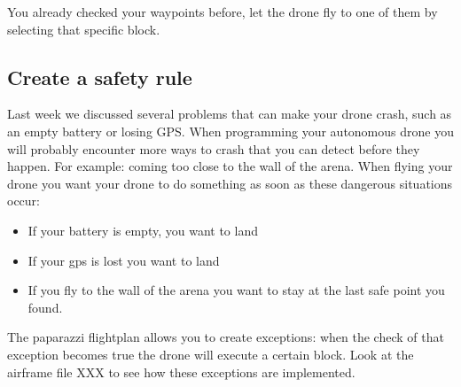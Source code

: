 \documentclass{article}
\begin{document}
You already checked your waypoints before, let the drone fly to one of them by selecting that specific block. 


\subsection*{Create a safety rule}
Last week we discussed several problems that can make your drone crash, such as an empty battery or losing GPS. When programming your autonomous drone you will probably encounter more ways to crash that you can detect before they happen. For example: coming too close to the wall of the arena. 
When flying your drone you want your drone to do something as soon as these dangerous situations occur:
\begin{itemize}
\item If your battery is empty, you want to land
\item If your gps is lost you want to land
\item If you fly to the wall of the arena you want to stay at the last safe point you found. 
\end{itemize}
The paparazzi flightplan allows you to create exceptions: when the check of that exception becomes true the drone will execute a certain block. Look at the airframe file XXX to see how these exceptions are implemented. 
\end{document}
